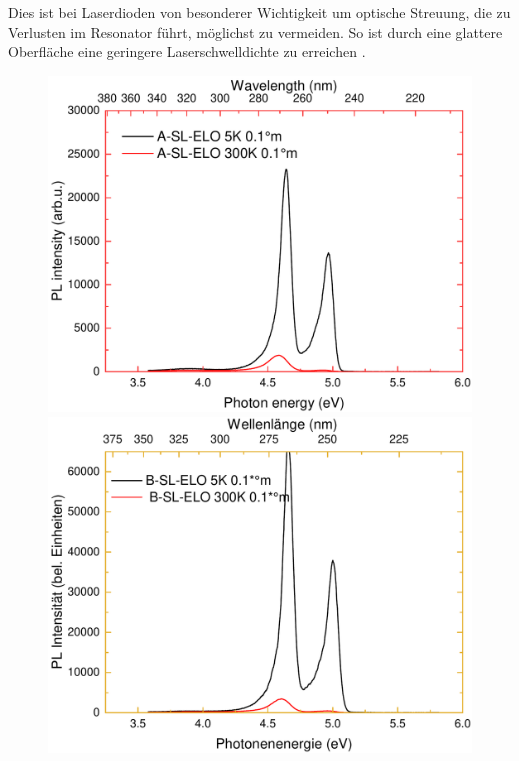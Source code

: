 Dies ist bei Laserdioden von besonderer Wichtigkeit um optische Streuung, die zu Verlusten im Resonator führt, möglichst zu vermeiden. So ist durch eine glattere Oberfläche eine geringere Laserschwelldichte zu erreichen \cite{doi:10.1002/pssa.201870032}.
\newline
\begin{figure}[H]
  \centering
  \begin{minipage}[t]{0.49\textwidth}
    \centering
    \includegraphics[width=\textwidth]{Bilder/TS4048/aslelo.pdf}
  \end{minipage}
	\hfill
  \begin{minipage}[t]{0.49\textwidth}
    \centering
    \includegraphics[width=\linewidth]{Bilder/TS4048/bslelo.pdf}

\end{minipage}
\end{figure}
